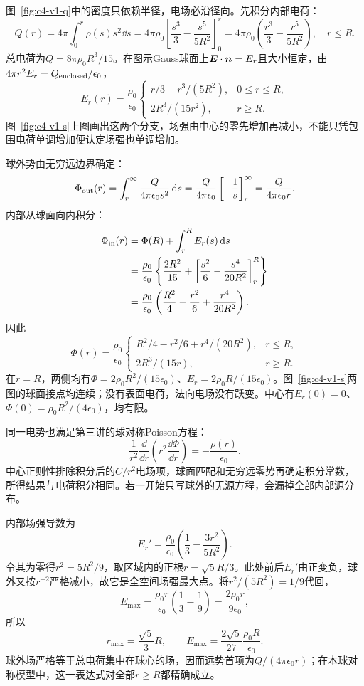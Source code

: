\begin{solution}
图~\ref{fig:c4-v1-q}中的密度只依赖半径，电场必沿径向。先积分内部电荷：
\[Q(r)=4\pi\int_0^r\rho(s)s^2\dd s
=4\pi\rho_0\left[\frac{s^3}{3}-\frac{s^5}{5R^2}\right]_0^r
=4\pi\rho_0\left(\frac{r^3}{3}-\frac{r^5}{5R^2}\right),\quad r\le R.
\]
总电荷为$\boxed{Q=8\pi\rho_0R^3/15}$。在图示Gauss球面上$\bm{E}\cdot\bm{n}=E_r$且大小恒定，由$4\pi r^2E_r=Q_{\rm enclosed}/\epsilon_0$，
\[\boxed{E_r(r)=\frac{\rho_0}{\epsilon_0}
\begin{cases}
r/3-r^3/(5R^2),&0\le r\le R,\\
2R^3/(15r^2),&r\ge R.
\end{cases}}\]
图~\ref{fig:c4-v1-s}上图画出这两个分支，场强由中心的零先增加再减小，不能只凭包围电荷单调增加便认定场强也单调增加。

球外势由无穷远边界确定：
\[\Phi_{\rm out}(r)=\int_r^\infty\frac{Q}{4\pi\epsilon_0s^2}\mathop{}\!\mathrm d s
=\frac{Q}{4\pi\epsilon_0}\left[-\frac1s\right]_r^\infty
=\frac{Q}{4\pi\epsilon_0r}.\]
内部从球面向内积分：
\[\begin{aligned}
\Phi_{\rm in}(r)&=\Phi(R)+\int_r^R E_r(s)\mathop{}\!\mathrm d s\\
&=\frac{\rho_0}{\epsilon_0}\left\{\frac{2R^2}{15}
+\left[\frac{s^2}{6}-\frac{s^4}{20R^2}\right]_r^R\right\}\\
&=\frac{\rho_0}{\epsilon_0}\left(\frac{R^2}{4}-\frac{r^2}{6}
+\frac{r^4}{20R^2}\right).
\end{aligned}\]
因此
\[\boxed{\Phi(r)=\frac{\rho_0}{\epsilon_0}
\begin{cases}
R^2/4-r^2/6+r^4/(20R^2),&r\le R,\\
2R^3/(15r),&r\ge R.
\end{cases}}\]
在$r=R$，两侧均有$\Phi=2\rho_0R^2/(15\epsilon_0)$、$E_r=2\rho_0R/(15\epsilon_0)$。图~\ref{fig:c4-v1-s}两图的球面接点均连续；没有表面电荷，法向电场没有跃变。中心有$E_r(0)=0$、$\Phi(0)=\rho_0R^2/(4\epsilon_0)$，均有限。

同一电势也满足第三讲的球对称Poisson方程：
\[\frac1{r^2}\frac{\dd}{\dd r}\left(r^2\frac{\dd\Phi}{\dd r}\right)
=-\frac{\rho(r)}{\epsilon_0}.
\]
中心正则性排除积分后的$C/r^2$电场项，球面匹配和无穷远零势再确定积分常数，所得结果与电荷积分相同。若一开始只写球外的无源方程，会漏掉全部内部源分布。

内部场强导数为
\[E_r'=\frac{\rho_0}{\epsilon_0}\left(\frac13-\frac{3r^2}{5R^2}\right).
\]
令其为零得$r^2=5R^2/9$，取区域内的正根$r=\sqrt5R/3$。此处前后$E_r'$由正变负，球外又按$r^{-2}$严格减小，故它是全空间场强最大点。将$r^2/(5R^2)=1/9$代回，
\[E_{\max}=\frac{\rho_0r}{\epsilon_0}
\left(\frac13-\frac19\right)=\frac{2\rho_0r}{9\epsilon_0},\]
所以
\[\boxed{r_{\max}=\frac{\sqrt5}{3}R,\qquad
E_{\max}=\frac{2\sqrt5}{27}\frac{\rho_0R}{\epsilon_0}}.
\]
球外场严格等于总电荷集中在球心的场，因而远势首项为$Q/(4\pi\epsilon_0r)$；在本球对称模型中，这一表达式对全部$r\ge R$都精确成立。
\begin{figure}[H]\centering
\begin{tikzpicture}[>=Stealth,line cap=round,line join=round]


\end{tikzpicture}
\end{figure}
\end{solution}
